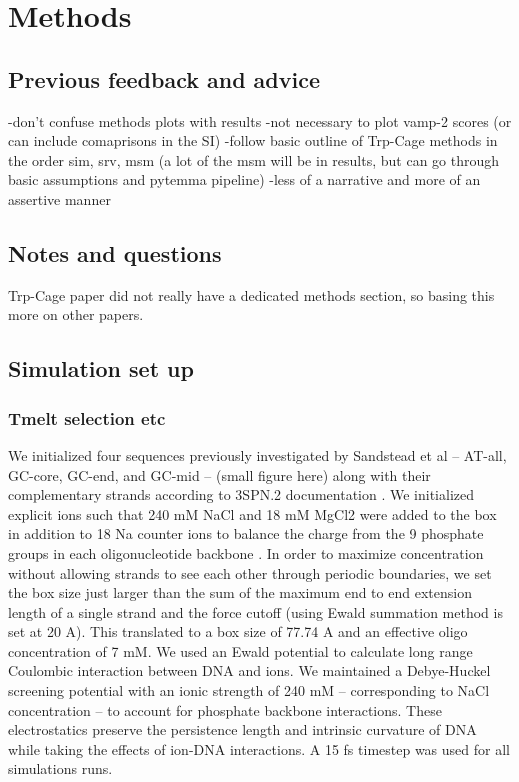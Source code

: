\documentclass[journal=jpcbfk,manuscript=article]{achemso}
\begin{document}
\section{\label{sec:methods}Methods}

\subsection{\label{sec:methods}Previous feedback and advice} 

-don't confuse methods plots with results
-not necessary to plot vamp-2 scores (or can include comaprisons in the SI)
-follow basic outline of Trp-Cage methods in the order sim, srv, msm (a lot of the msm will be in results, but can go through basic assumptions and pytemma pipeline)
-less of a narrative and more of an assertive manner

\subsection{\label{sec:methods}Notes and questions} 
Trp-Cage paper did not really have a dedicated methods section, so basing this more on other papers.

\subsection{\label{sec:methods}Simulation set up}
\subsubsection{\label{sec:methods}Tmelt selection etc}

We initialized four sequences previously investigated by Sandstead et al \citep{Sanstead2016} -- AT-all, GC-core, GC-end, and GC-mid -- (small figure here) along with their complementary strands according to 3SPN.2 documentation \citep{Phys2014}. We initialized explicit ions such that 240 mM NaCl and 18 mM MgCl2 were added to the box in addition to 18 Na counter ions to balance the charge from the 9 phosphate groups in each oligonucleotide backbone \citep{Hinckley2015}. In order to maximize concentration without allowing strands to see each other through periodic boundaries, we set the box size just larger than the sum of the maximum end to end extension length of a single strand and the force cutoff (using Ewald summation method is set at 20 A). This translated to a box size of 77.74 A and an effective oligo concentration of 7 mM. We used an Ewald potential to calculate long range 
Coulombic interaction between DNA and ions. We maintained a Debye-Huckel screening potential with an ionic strength of 240 mM -- corresponding to NaCl concentration -- to account for phosphate backbone interactions. These electrostatics preserve the persistence length and intrinsic curvature of DNA while taking the effects of ion-DNA interactions\citep{Hinckley2015}. A 15 fs timestep was used for all simulations runs.
\end{document}

